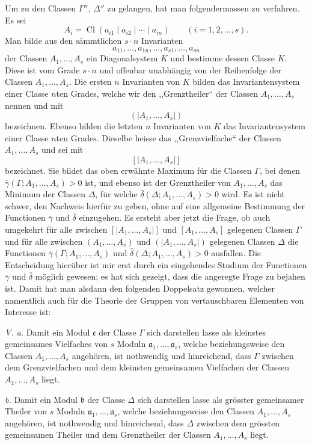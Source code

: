 \documentclass[11pt,a4paper]{article}
\newcommand{\Cl}{\operatorname{Cl}}
\begin{document}
Um zu den Classen $\Gamma''$, $\Delta''$ zu gelangen, hat man folgendermassen zu verfahren. Es sei
\[
 A_i=\Cl(a_{i1}\mid a_{i2}\mid\cdots\mid a_{in})\qquad (i=1,2,\ldots,s).
\]
Man bilde aus den sämmtlichen $s\cdot n$ Invarianten
\[
 a_{11},\ldots,a_{1n},\ldots,a_{s1},\ldots,a_{sn}
\]
der Classen $A_1,\ldots,A_s$ ein Diagonalsystem $K$ und bestimme dessen Classe $K$. Diese ist vom Grade $s\cdot n$ und offenbar unabhängig von der Reihenfolge der Classen $A_1,\ldots,A_s$. Die ersten $n$ Invarianten von $K$ bilden das Invariantensystem einer Classe $n$ten Grades, welche wir den ,,Grenztheiler`` der Classen $A_1,\ldots,A_s$ nennen und mit
\[
 (\!|A_1,\ldots,A_s|\!)
\]
bezeichnen. Ebenso bilden die letzten $n$ Invarianten von $K$ das Invariantensystem einer Classe $n$ten Grades. Dieselbe heisse das ,,Grenzvielfache`` der Classen $A_1,\ldots,A_s$ und sei mit
\[
 [\!|A_1,\ldots,A_s|\!]
\]
bezeichnet. Sie bildet das oben erwähnte Maximum für die Classen $\Gamma$, bei denen $\bar\gamma(\Gamma;A_1,\ldots,A_s)>0$ ist, und ebenso ist der Grenztheiler von $A_1,\ldots,A_s$ das Minimum der Classen $\Delta$, für welche $\bar\delta(\Delta;A_1,\ldots,A_s)>0$ wird. Es ist nicht schwer, den Nachweis hierfür zu geben, ohne auf eine allgemeine Bestimmung der Functionen $\bar\gamma$ und $\bar\delta$ einzugehen. Es ersteht aber jetzt die Frage, ob auch umgekehrt für alle zwischen $[\!|A_1,\ldots,A_s|\!]$ und $[A_1,\ldots,A_s]$ gelegenen Classen $\Gamma$ und für alle zwischen $(A_1,\ldots,A_s)$ und $(\!|A_1,\ldots,A_s|\!)$ gelegenen Classen $\Delta$ die Functionen $\bar\gamma(\Gamma;A_1,\ldots,A_s)$ und $\bar\delta(\Delta;A_1,\ldots,A_s)>0$ ausfallen. Die Entscheidung hierüber ist mir erst durch ein eingehendes Studium der Functionen $\bar\gamma$ und $\bar\delta$ möglich gewesen; es hat sich gezeigt, dass die angeregte Frage zu bejahen ist. Damit hat man alsdann den folgenden Doppelsatz gewonnen, welcher namentlich auch für die Theorie der Gruppen von vertauschbaren Elementen von Interesse ist:

\emph{V. a.} Damit ein Modul $\mathfrak c$ der Classe $\Gamma$ sich darstellen lasse als kleinstes gemeinsames Vielfaches von $s$ Moduln $\mathfrak a_1,\ldots,\mathfrak a_s$, welche beziehungsweise den Classen $A_1,\ldots,A_s$ angehören, ist nothwendig und hinreichend, dass $\Gamma$ zwischen dem Grenzvielfachen und dem kleinsten gemeinsamen Vielfachen der Classen $A_1,\ldots,A_s$ liegt.

\emph{b.} Damit ein Modul $\mathfrak b$ der Classe $\Delta$ sich darstellen lasse als grösster gemeinsamer Theiler von $s$ Moduln $\mathfrak a_1,\ldots,\mathfrak a_s$, welche beziehungsweise den Classen $A_1,\ldots,A_s$ angehören, ist nothwendig und hinreichend, dass $\Delta$ zwischen dem grössten gemeinsamen Theiler und dem Grenztheiler der Classen $A_1,\ldots,A_s$ liegt.
\end{document}
